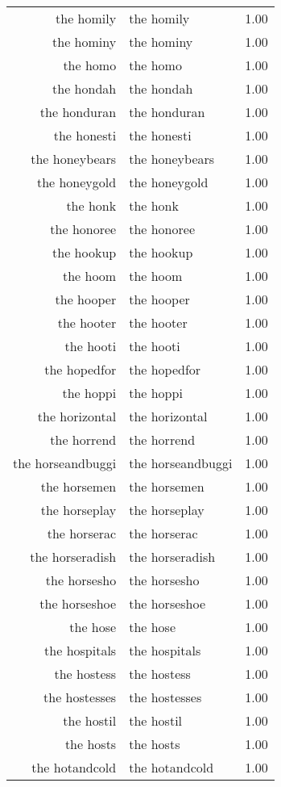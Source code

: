 \begin{table}[ht]
\begin{tabular}{rlr}
  the homily & the homily & 1.00 \\ 
  the hominy & the hominy & 1.00 \\ 
  the homo & the homo & 1.00 \\ 
  the hondah & the hondah & 1.00 \\ 
  the honduran & the honduran & 1.00 \\ 
  the honesti & the honesti & 1.00 \\ 
  the honeybears & the honeybears & 1.00 \\ 
  the honeygold & the honeygold & 1.00 \\ 
  the honk & the honk & 1.00 \\ 
  the honoree & the honoree & 1.00 \\ 
  the hookup & the hookup & 1.00 \\ 
  the hoom & the hoom & 1.00 \\ 
  the hooper & the hooper & 1.00 \\ 
  the hooter & the hooter & 1.00 \\ 
  the hooti & the hooti & 1.00 \\ 
  the hopedfor & the hopedfor & 1.00 \\ 
  the hoppi & the hoppi & 1.00 \\ 
  the horizontal & the horizontal & 1.00 \\ 
  the horrend & the horrend & 1.00 \\ 
  the horseandbuggi & the horseandbuggi & 1.00 \\ 
  the horsemen & the horsemen & 1.00 \\ 
  the horseplay & the horseplay & 1.00 \\ 
  the horserac & the horserac & 1.00 \\ 
  the horseradish & the horseradish & 1.00 \\ 
  the horsesho & the horsesho & 1.00 \\ 
  the horseshoe & the horseshoe & 1.00 \\ 
  the hose & the hose & 1.00 \\ 
  the hospitals & the hospitals & 1.00 \\ 
  the hostess & the hostess & 1.00 \\ 
  the hostesses & the hostesses & 1.00 \\ 
  the hostil & the hostil & 1.00 \\ 
  the hosts & the hosts & 1.00 \\ 
  the hotandcold & the hotandcold & 1.00 \\ 

\end{tabular}
\end{table}
